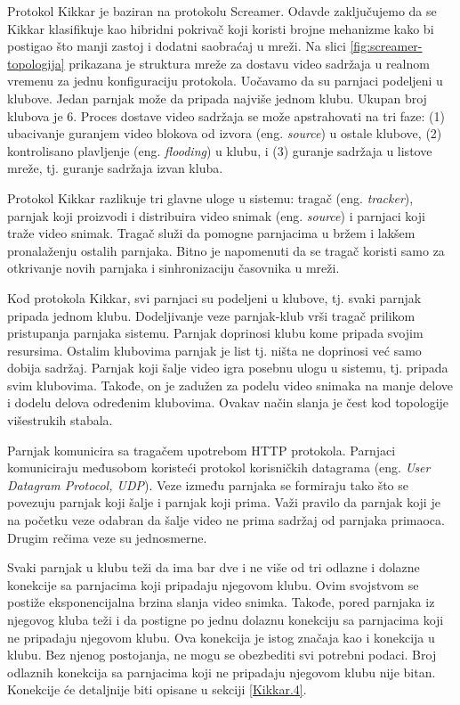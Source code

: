 \documentclass[12pt,oneside]{memoir}
\begin{document}
Protokol Kikkar je baziran na protokolu Screamer. Odavde zaključujemo da se Kikkar klasifikuje kao hibridni pokrivač koji koristi brojne mehanizme kako bi postigao što manji zastoj i dodatni saobraćaj u mreži. Na slici \ref{fig:screamer-topologija} prikazana je struktura mreže za dostavu video sadržaja u realnom vremenu za jednu konfiguraciju protokola. Uočavamo da su parnjaci podeljeni u klubove. Jedan parnjak može da pripada najviše jednom klubu. Ukupan broj klubova je 6. Proces dostave video sadržaja se može apstrahovati na tri faze: (1) ubacivanje guranjem video blokova od izvora (eng. \textit{source}) u ostale klubove, (2) kontrolisano plavljenje (eng. \textit{flooding}) u klubu, i (3) guranje sadržaja u listove mreže, tj. guranje sadržaja izvan kluba.

Protokol Kikkar razlikuje tri glavne uloge u sistemu: tragač (eng. \textit{tracker}), parnjak koji proizvodi i distribuira video snimak (eng. \textit{source}) i parnjaci koji traže video snimak. Tragač služi da pomogne parnjacima u bržem i lakšem pronalaženju ostalih parnjaka. Bitno je napomenuti da se tragač koristi samo za otkrivanje novih parnjaka i sinhronizaciju časovnika u mreži. 

Kod protokola Kikkar, svi parnjaci su podeljeni u klubove, tj. svaki parnjak pripada jednom klubu. Dodeljivanje veze parnjak-klub vrši tragač prilikom pristupanja parnjaka sistemu. Parnjak doprinosi klubu kome pripada svojim resursima. Ostalim klubovima parnjak je list tj. ništa ne doprinosi već samo dobija sadržaj. Parnjak koji šalje video igra posebnu ulogu u sistemu, tj. pripada svim klubovima. Takođe, on je zadužen za podelu video snimaka na manje delove i dodelu delova određenim klubovima. Ovakav način slanja je čest kod topologije višestrukih stabala.

Parnjak komunicira sa tragačem upotrebom HTTP protokola. Parnjaci komuniciraju međusobom koristeći protokol korisničkih datagrama (eng. \textit{User Datagram Protocol, UDP}). Veze između parnjaka se formiraju tako što se povezuju parnjak koji šalje i parnjak koji prima. Važi pravilo da parnjak koji je na početku veze odabran da šalje video ne prima sadržaj od parnjaka primaoca. Drugim rečima veze su jednosmerne.  

Svaki parnjak u klubu teži da ima bar dve i ne više od tri odlazne i dolazne konekcije sa parnjacima koji pripadaju njegovom klubu. Ovim svojstvom se postiže eksponencijalna brzina slanja video snimka. Takođe, pored parnjaka iz njegovog kluba teži i da postigne po jednu dolaznu konekciju sa parnjacima koji ne pripadaju njegovom klubu. Ova konekcija je istog značaja kao i konekcija u klubu. Bez njenog postojanja, ne mogu se obezbediti svi potrebni podaci. Broj odlaznih konekcija sa parnjacima koji ne pripadaju njegovom klubu nije bitan. Konekcije će detaljnije biti opisane u sekciji \ref{Kikkar.4}. 
\end{document}
